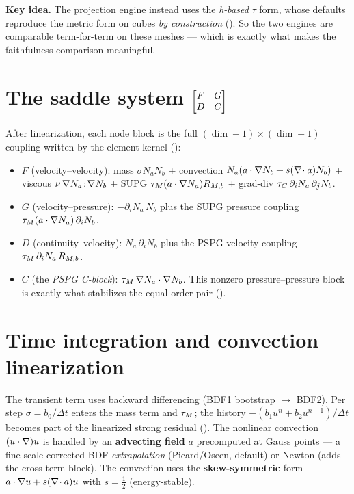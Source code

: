 \begin{keybox}\textbf{Key idea.} The projection engine instead uses the
\emph{h-based} $\tau$ form, whose defaults reproduce the metric form on
cubes \emph{by construction} (). So the two
engines are comparable term-for-term on these meshes --- which is exactly
what makes the faithfulness comparison meaningful.\end{keybox}

\section{The saddle system $\begin{bmatrix}F&G\\D&C\end{bmatrix}$}
After linearization, each node block is the full
$(\dim+1)\times(\dim+1)$ coupling written by the element kernel
 ():
\begin{itemize}
\item \textbf{$F$} (velocity--velocity): mass $\sigma N_a N_b$ + convection
  $N_a(a\cdot\nabla N_b + s(\nabla\!\cdot a)N_b)$ + viscous
  $\nu\,\nabla N_a\!:\!\nabla N_b$ + SUPG $\tau_M(a\cdot\nabla N_a)R_{M,b}$ +
  grad-div $\tau_C\,\partial_i N_a\,\partial_j N_b$.
\item \textbf{$G$} (velocity--pressure): $-\partial_i N_a\,N_b$ plus the
  SUPG pressure coupling $\tau_M(a\cdot\nabla N_a)\,\partial_i N_b$.
\item \textbf{$D$} (continuity--velocity): $N_a\,\partial_i N_b$ plus the
  PSPG velocity coupling $\tau_M\,\partial_i N_a\,R_{M,b}$.
\item \textbf{$C$} (the \emph{PSPG C-block}): $\tau_M\,\nabla N_a\cdot\nabla
  N_b$. This nonzero pressure--pressure block is exactly what stabilizes
  the equal-order pair ().
\end{itemize}

\section{Time integration and convection linearization}
The transient term uses backward differencing (BDF1 bootstrap $\to$ BDF2).
Per step $\sigma=b_0/\Delta t$ enters the mass term and $\tau_M$; the
history $-(b_1 u^n+b_2 u^{n-1})/\Delta t$ becomes part of the linearized
strong residual (). The nonlinear convection
$(u\cdot\nabla)u$ is handled by an \textbf{advecting field} $a$ precomputed
at Gauss points --- a fine-scale-corrected BDF \emph{extrapolation}
(Picard/Oseen, default) or Newton (adds the cross-term block). The
convection uses the \textbf{skew-symmetric} form
$a\cdot\nabla u + s(\nabla\!\cdot a)u$ with $s=\tfrac12$ (energy-stable).

